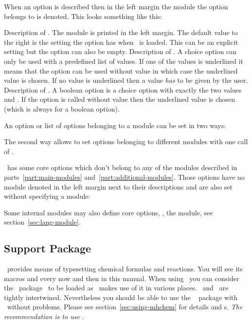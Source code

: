 \documentclass{chemmacros-manual}
\begin{document}
When an option is described then in the left margin the module the option
belongs to is denoted.  This looks something like this:
\begin{options}
  \Default
    Description of . The module is printed in the left margin.
    The default value to the right is the setting the option has when
    \chemmacros\ is loaded.  This can be an explicit setting but the option
    can also be empty.
    Description of .  A choice option can only be used
    with a predefined list of values. If one of the values is underlined it
    means that the option can be used without value in which case the
    underlined value is chosen.  If no value is underlined then a value
    \emph{has} to be given by the user.
    Description of .  A boolean option is a choice
    option with exactly the two values  and .  If the
    option is called without value then the underlined value is chosen (which
    is always  for a boolean option).
\end{options}

An option or list of options belonging to a module  can be
set in two ways:
\begin{sourcecode}
\end{sourcecode}
The second way allows to set options belonging to different modules with one
call of .

\chemmacros\ has some core options which don't belong to any of the modules
described in parts~\ref{part:main-modules} and~\ref{part:additional-modules}.
Those options have no module denoted in the left margin next to their
descriptions and are also set without specifying a module:
\begin{sourcecode}
\end{sourcecode}
Some internal modules may also define core options, \eg, the 
module, see section~\vref{sec:lang-module}.

\subsection{Support Package \chemformula}
\chemformula\ provides means of typesetting chemical formulas and reactions.
You will see its macros  and  every now and then in this
manual.  When using \chemmacros\ you can consider the \chemformula\
package~\cite{pkg:chemformula} to be loaded as \chemmacros\ makes use of it in
various places.  \chemmacros\ and \chemformula\ are tightly intertwined.
Nevertheless you should be able to use the \pkg{mhchem}~\cite{pkg:mhchem}
package with \chemmacros\ without problems. Please see
section~\vref{sec:using-mhchem} for details and s.  \emph{The
  recommendation is to use \chemformula.}
\end{document}
